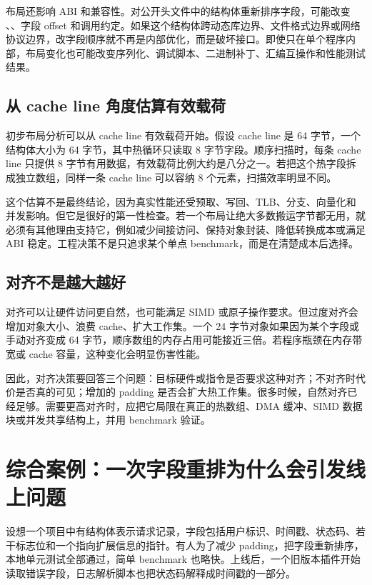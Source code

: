 布局还影响 ABI 和兼容性。对公开头文件中的结构体重新排序字段，可能改变 、、字段 offset 和调用约定。如果这个结构体跨动态库边界、文件格式边界或网络协议边界，改字段顺序就不再是内部优化，而是破坏接口。即使只在单个程序内部，布局变化也可能改变序列化、调试脚本、二进制补丁、汇编互操作和性能测试结果。

\subsection{从 cache line 角度估算有效载荷}

初步布局分析可以从 cache line 有效载荷开始。假设 cache line 是 64 字节，一个结构体大小为 64 字节，其中热循环只读取 8 字节字段。顺序扫描时，每条 cache line 只提供 8 字节有用数据，有效载荷比例大约是八分之一。若把这个热字段拆成独立数组，同样一条 cache line 可以容纳 8 个元素，扫描效率明显不同。

这个估算不是最终结论，因为真实性能还受预取、写回、TLB、分支、向量化和并发影响。但它是很好的第一性检查。若一个布局让绝大多数搬运字节都无用，就必须有其他理由支持它，例如减少间接访问、保持对象封装、降低转换成本或满足 ABI 稳定。工程决策不是只追求某个单点 benchmark，而是在清楚成本后选择。

\subsection{对齐不是越大越好}

对齐可以让硬件访问更自然，也可能满足 SIMD 或原子操作要求。但过度对齐会增加对象大小、浪费 cache、扩大工作集。一个 24 字节对象如果因为某个字段或手动对齐变成 64 字节，顺序数组的内存占用可能接近三倍。若程序瓶颈在内存带宽或 cache 容量，这种变化会明显伤害性能。

因此，对齐决策要回答三个问题：目标硬件或指令是否要求这种对齐；不对齐时代价是否真的可见；增加的 padding 是否会扩大热工作集。很多时候，自然对齐已经足够。需要更高对齐时，应把它局限在真正的热数组、DMA 缓冲、SIMD 数据块或并发共享结构上，并用 benchmark 验证。

\section{综合案例：一次字段重排为什么会引发线上问题}

设想一个项目中有结构体表示请求记录，字段包括用户标识、时间戳、状态码、若干标志位和一个指向扩展信息的指针。有人为了减少 padding，把字段重新排序，本地单元测试全部通过，简单 benchmark 也略快。上线后，一个旧版本插件开始读取错误字段，日志解析脚本也把状态码解释成时间戳的一部分。

